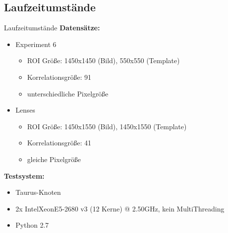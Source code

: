 \subsection{Laufzeitumstände}
\begin{frame}{Laufzeitumstände}
	\textbf{Datensätze:}
	\begin{itemize}
		\item<2-> Experiment 6
		\begin{itemize}
			\item ROI Größe: 1450x1450 (Bild), 550x550 (Template)
			\item Korrelationsgröße: 91
			\item unterschiedliche Pixelgröße
		\end{itemize}
		\item<3-> Lenses
		\begin{itemize}
			\item ROI Größe: 1450x1550 (Bild), 1450x1550 (Template)
			\item Korrelationsgröße: 41
			\item gleiche Pixelgröße
		\end{itemize}
	\end{itemize}
	
	\vspace{0.5cm}
	
	\textbf{Testsystem:}
	\begin{itemize}
		\item<4-> Taurus-Knoten
		\item<4-> 2x Intel\textregistered Xeon\textregistered E5-2680 v3 (12 Kerne) @ 2.50GHz, kein MultiThreading
		\item<4-> Python 2.7
	\end{itemize}
\end{frame}

